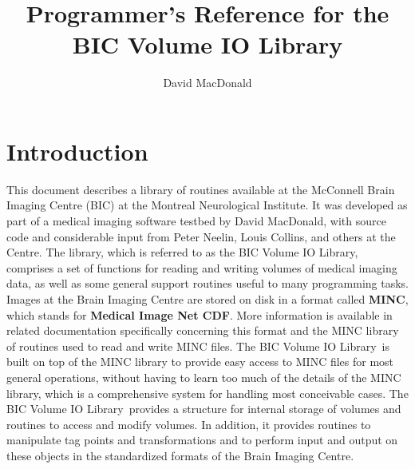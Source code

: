 
\title{Programmer's Reference for the \\
BIC Volume IO Library}

\author{David MacDonald}

\newcommand{\name}[1]{{\bf\tt #1}}

\newcommand{\desc}[1]{\begin{itemize}
\item[] #1
\end{itemize}}

\newcommand{\vol}{BIC Volume IO Library}



\maketitle

\newpage

\tableofcontents

\newpage

\chapter{Introduction}

This document describes a library of routines available at the
McConnell Brain Imaging Centre (BIC) at the Montreal Neurological Institute.
It was developed as part of a medical imaging software testbed by
David MacDonald, with source code and considerable input from Peter
Neelin, Louis Collins, and others at the Centre.
The library, which is referred to as the \vol, comprises a set of functions
for reading and writing
volumes of medical imaging data, as well as some general support
routines useful to many programming tasks.  Images at the Brain
Imaging Centre are stored on disk in a format called {\bf MINC}, which
stands for {\bf Medical Image Net CDF}.  More information 
is available in related documentation specifically concerning this
format and
the MINC library of routines used to read and write MINC files.  The
\vol\  is built on top of the MINC library to
provide easy access to MINC files for most general operations, without
having to learn too much of
the details of the MINC library, which is a comprehensive system for handling
most conceivable cases.  The \vol\  provides a structure for internal
storage of volumes and routines to access and modify volumes.  In
addition, it provides routines to manipulate tag points and
transformations and to perform input and output on these objects in
the standardized formats of the Brain Imaging Centre.

